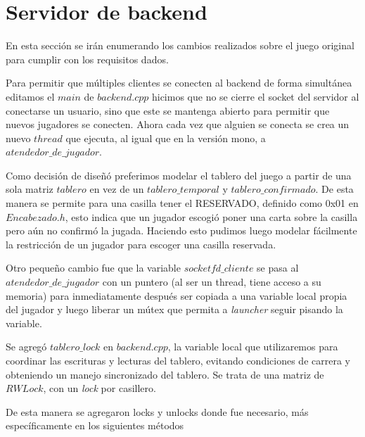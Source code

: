 \section{Servidor de backend}

En esta sección se irán enumerando los cambios realizados sobre el juego original para cumplir con los requisitos dados.

Para permitir que múltiples clientes se conecten al backend de forma simultánea editamos el $main$ de $backend.cpp$ hicimos que no se cierre el socket del servidor al conectarse un usuario, sino que este se mantenga abierto para permitir que nuevos jugadores se conecten. Ahora cada vez que alguien se conecta se crea un nuevo $thread$ que ejecuta, al igual que en la versión mono, a $atendedor\_de\_jugador$.

Como decisión de diseñó preferimos modelar el tablero del juego a partir de una sola matriz $tablero$ en vez de un $tablero\_temporal$ y $tablero\_confirmado$. De esta manera se permite para una casilla tener el RESERVADO, definido como 0x01 en $Encabezado.h$, esto indica que un jugador escogió poner una carta sobre la casilla pero aún no confirmó la jugada. Haciendo esto pudimos luego modelar fácilmente la restricción de un jugador para escoger una casilla reservada.

Otro pequeño cambio fue que la variable $socketfd\_cliente$ se pasa al $atendedor\_de\_jugador$ con un puntero (al ser un thread, tiene acceso a su memoria) para inmediatamente después ser copiada a una variable local propia del jugador y luego liberar un mútex que permita a \emph{launcher} seguir pisando la variable. 

Se agregó $tablero\_lock$ en $backend.cpp$, la variable local que utilizaremos para coordinar las escrituras y lecturas del tablero, evitando condiciones de carrera y obteniendo un manejo sincronizado del tablero. Se trata de una matriz de $RWLock$, con un \emph{lock} por casillero.

De esta manera se agregaron locks y unlocks donde fue necesario, más específicamente en los siguientes métodos

